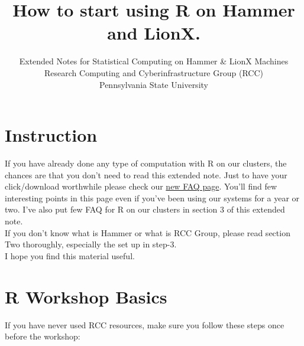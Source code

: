 \documentclass[12pt]{article}
\begin{document}
\title{ How to start using R on Hammer and LionX.\\}
\author{
        Extended Notes for Statistical Computing on Hammer \& LionX Machines \\
        Research Computing and Cyberinfrastructure Group (RCC)\\
        Pennsylvania State University\\        
            \and
        }
\date{}
\maketitle

\section{Instruction}
 


If you have already done any type of computation with R on our clusters, the chances are that you don't need to read this extended note. Just to have your click/download worthwhile please check our \href{http://rcc.its.psu.edu/FAQ.html}{new FAQ page}. You'll find few interesting points in this page even if you've been using our systems for a year or two.
I've also put few FAQ for R on our clusters in section 3 of this extended note.\\
If you don't know what is Hammer or what is RCC Group, please read section Two thoroughly, especially the set up in step-3. \\
I hope you find this material useful.

\newpage
\section{R Workshop Basics} 
If you have never used RCC resources, make sure you follow these steps once before the workshop:\\
\end{document}
